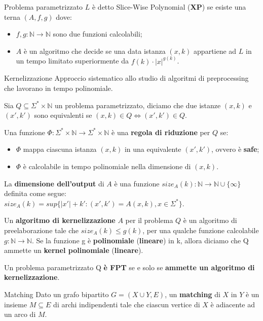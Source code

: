 \documentclass[10pt,a4paper]{article}
\begin{document}
\begin{multicols}{3}
\begin{textbox}{Problema parametrizzato}
\(L\) è detto Slice-Wise Polynomial (\textbf{XP}) se esiste una terna \((A,f,g)\) dove:
\begin{itemize}[leftmargin=*]
    \item \(f, g:\mathbb{N} \rightarrow \mathbb{N}\) sono due funzioni calcolabili;
    \item \(A\) è un algoritmo che decide se una data istanza \((x,k)\) appartiene ad \(L\) in un tempo limitato superiormente da \(f(k)\cdot|x|^{g(k)}\).
\end{itemize}
\end{textbox}

\begin{textbox}{Kernelizzazione}
Approccio sistematico allo studio di
algoritmi di preprocessing che lavorano in
tempo polinomiale.

Sia  \(Q \subseteq \Sigma^\ast \times \mathbb{N}\) un problema parametrizzato, diciamo che due
istanze \((x,k)\) e \((x',k')\) sono equivalenti se  \((x,k)\in Q \Leftrightarrow (x',k')\in Q \).

Una funzione \(\Phi: \Sigma^\ast \times \mathbb{N} \rightarrow \Sigma^\ast \times \mathbb{N}\) è una \textbf{regola di riduzione} per \(Q\) se:
\begin{itemize}[leftmargin=*]
    \item \(\Phi\) mappa ciascuna istanza \((x,k)\) in una equivalente \((x',k')\), ovvero è \textbf{safe};
    \item \(\Phi\) è calcolabile in tempo polinomiale nella dimensione di \((x,k)\).
\end{itemize}

La \textbf{dimensione dell’output} di \(A\) è
una funzione \(size_A(k):\mathbb{N} \rightarrow \mathbb{N}\cup\{\infty\}\)
definita come segue:\\
\(size_A(k) = sup\{|x'|+k': (x',k') = A(x,k), x \in \Sigma^\ast\}\).

Un \textbf{algoritmo di kernelizzazione} \(A\) per il problema \(Q\) è un algoritmo di
preelaborazione tale che \(size_A(k) \leq g(k)\), per una qualche
funzione calcolabile \(g:\mathbb{N} \rightarrow \mathbb{N}\).
Se la funzione g è \textbf{polinomiale} (\textbf{lineare}) in k, allora diciamo che Q ammette un
\textbf{kernel polinomiale} (\textbf{lineare}).

Un problema parametrizzato Q \textbf{è FPT} se e solo se
\textbf{ammette un algoritmo di kernelizzazione}.
\end{textbox}

\begin{textbox}{Matching}
Dato un grafo bipartito \(G=(X\cup Y,E)\), un \textbf{matching} di \(X\) in \(Y\) è un
insieme \(M\subseteq E\) di archi indipendenti tale che ciascun vertice di \(X\) è
adiacente ad un arco di \(M\).


\end{textbox}
\end{multicols}
\end{document}
